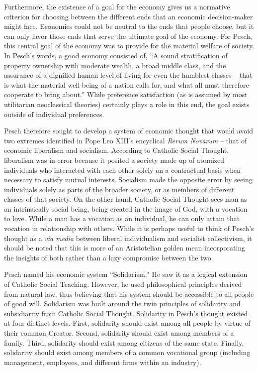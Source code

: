 \documentclass{article}
\begin{document}
Furthermore, the existence of a goal for the economy gives us a normative criterion for choosing between the different ends that an economic decision-maker might face.  Economics could not be neutral to the ends that people choose, but it can only favor those ends that serve the ultimate goal of the economy.  For Pesch, this central goal of the economy was to provide for the material welfare of society.  \citep{mulcahy1949}  In Pesch’s words, a good economy consisted of, ``A sound stratification of property ownership with moderate wealth, a broad middle class, and the assurance of a dignified human level of living for even the humblest classes – that is what the material well-being of a nation calls for, and what all must therefore cooperate to bring about." \citep[p. 180]{pesch1998}  While preference satisfaction (as is assumed by most utilitarian neoclassical theories) certainly plays a role in this end, the goal exists outside of individual preferences.\medskip

Pesch therefore sought to develop a system of economic thought that would avoid two extremes identified in Pope Leo XIII’s encyclical \emph{Rerum Novarum} – that of economic liberalism and socialism.  According to Catholic Social Thought, liberalism was in error because it posited a society made up of atomized individuals who interacted with each other solely on a contractual basis when necessary to satisfy mutual interests.  Socialism made the opposite error by seeing individuals solely as parts of the broader society, or as members of different classes of that society. \citep{schuyler1953}  On the other hand, Catholic Social Thought sees man as an intrinsically social being, being created in the image of God, with a vocation to love. \citep[no. 34]{pcjp2004}  While a man has a vocation as an individual, he can only attain that vocation in relationship with others.  While it is perhaps useful to think of Pesch’s thought as a \emph{via media} between liberal individualism and socialist collectivism, it should be noted that this is more of an Aristotelian golden mean incorporating the insights of both rather than a lazy compromise between the two. \citep{koslowski2000}\medskip

Pesch named his economic system ``Solidarism."  He saw it as a logical extension of Catholic Social Teaching.  However, he used philosophical principles derived from natural law, thus believing that his system should be accessible to all people of good will.  Solidarism was built around the twin principles of solidarity and subsidiarity from Catholic Social Thought.  Solidarity in Pesch’s thought existed at four distinct levels.  First, solidarity should exist among all people by virtue of their common Creator.  Second, solidarity should exist among members of a family.  Third, solidarity should exist among citizens of the same state.  Finally, solidarity should exist among members of a common vocational group (including management, employees, and different firms within an industry). \citep[pp. 69-70]{pesch1998}\medskip
\end{document}
